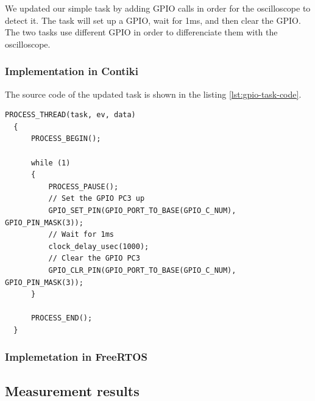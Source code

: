 We updated our simple task by adding GPIO calls in order for the oscilloscope to detect it.
The task will set up a GPIO, wait for 1ms, and then clear the GPIO.
The two tasks use different GPIO in order to differenciate them with the oscilloscope.

\subsubsection{Implementation in Contiki}
The source code of the updated task is shown in the listing \ref{lst:gpio-task-code}.

\begin{lstlisting}[style=CStyle, float, label={lst:gpio-task-code}, caption={Source code of the task with GPIO calls}]
  PROCESS_THREAD(task, ev, data)
  {
      PROCESS_BEGIN();
  
      while (1)
      {
          PROCESS_PAUSE();
          // Set the GPIO PC3 up
          GPIO_SET_PIN(GPIO_PORT_TO_BASE(GPIO_C_NUM), GPIO_PIN_MASK(3));
          // Wait for 1ms
          clock_delay_usec(1000);
          // Clear the GPIO PC3
          GPIO_CLR_PIN(GPIO_PORT_TO_BASE(GPIO_C_NUM), GPIO_PIN_MASK(3));
      }
  
      PROCESS_END();
  }
\end{lstlisting}

\subsubsection{Implemetation in FreeRTOS}


\subsection{Measurement results}




